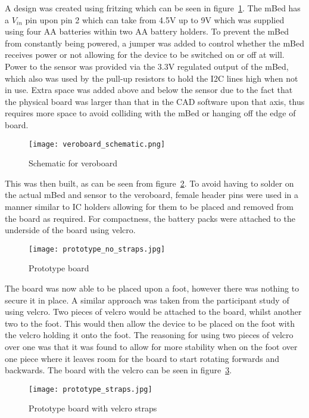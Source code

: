 A design was created using fritzing \cite{fritzing} which can be seen in figure~\ref{fig:veroboard_schematic}. The mBed has a $V_{in}$ pin upon pin 2 which can take from 4.5V up to 9V which was supplied using four AA batteries within two AA battery holders. To prevent the mBed from constantly being powered, a jumper was added to control whether the mBed receives power or not allowing for the device to be switched on or off at will. Power to the sensor was provided via the 3.3V regulated output of the mBed, which also was used by the pull-up resistors to hold the I2C lines high when not in use. Extra space was added above and below the sensor due to the fact that the physical board was larger than that in the CAD software upon that axis, thus requires more space to avoid colliding with the mBed or hanging off the edge of board.

\begin{figure}
	\centering
	\texttt{[image: veroboard\_schematic.png]}
	\caption{Schematic for veroboard}
	\label{fig:veroboard_schematic}
\end{figure}

This was then built, as can be seen from figure~\ref{fig:board}. To avoid having to solder on the actual mBed and sensor to the veroboard, female header pins were used in a manner similar to IC holders allowing for them to be placed and removed from the board as required. For compactness, the battery packs were attached to the underside of the board using velcro. 

\begin{figure}
	\centering
	\texttt{[image: prototype\_no\_straps.jpg]}
	\caption{Prototype board}
	\label{fig:board}
\end{figure}

The board was now able to be placed upon a foot, however there was nothing to secure it in place. A similar approach was taken from the participant study of using velcro. Two pieces of velcro would be attached to the board, whilst another two to the foot. This would then allow the device to be placed on the foot with the velcro holding it onto the foot. The reasoning for using two pieces of velcro over one was that it was found to allow for more stability when on the foot over one piece where it leaves room for the board to start rotating forwards and backwards. The board with the velcro can be seen in figure~\ref{fig:board:velcro}.

\begin{figure}
	\centering
	\texttt{[image: prototype\_straps.jpg]}
	\caption{Prototype board with velcro straps}
	\label{fig:board:velcro}
\end{figure}